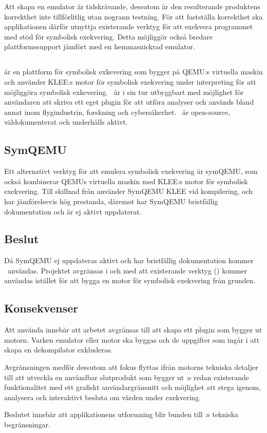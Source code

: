 
Att skapa en emulator är tidskrävande, dessutom är den resulterande produktens
korrekthet inte tillförlitlig utan nogrann testning. För att fastställa
korrekthet ska applikationen därför utnyttja existerande verktyg för att
exekvera programmet med stöd för symbolisk exekvering. Detta möjliggör också
bredare plattformssupport jämfört med en hemmasnickrad emulator.

\subsection{\stoe}
\stoe är en plattform för symbolisk exkevering som bygger på QEMU:s virtuella
maskin och använder KLEE:s motor för symbolisk exekvering under interpreting
för att möjliggöra symbolisk exkevering. \stoe\ är i sin tur utbyggbart med möjlighet
för användaren att skriva ett eget plugin för att utföra analyser och används
bland annat inom flygindustrin, forskning och cybersäkerhet. \stoe\ är open-source,
väldokumenterat och underhålls aktivt.\cite{}

\subsection{SymQEMU}

Ett alternativt verktyg för att emulera symbolisk exekvering är symQEMU, som också
kombinerar QEMUs virtuella maskin med KLEE:s motor för symbolisk exekvering. Till
skillnad från \stoe använder SymQEMU KLEE vid kompilering, och har jämförelsevis hög
prestanda, däremot har SymQEMU bristfällig dokumentation och är ej aktivt uppdaterat.
\cite{}

\subsection{Beslut}

Då SymQEMU ej uppdateras aktivt och har bristfällig dokumentation kommer \stoe\ användas.
Projektet avgränsas i och med att existerande verktyg (\stoe) kommer användas
istället för att bygga en motor för symbolisk exekvering från grunden.

\subsection{Konsekvenser}

Att använda \stoe innebär att arbetet avgränsas till att skapa ett plugin som bygger
ut motorn. Varken emulator eller motor ska byggas och de uppgifter som ingår i
att skapa en dekompilator exkluderas.

Avgränsningen medför dessutom att fokus flyttas ifrån motorns tekniska detaljer
till att utveckla en användbar slutprodukt som bygger ut \stoe:s redan
existerande funktionalitet med ett grafiskt användargränsnitt och möjlighet att
stega igenom, analysera och interaktivt besluta om värden under exekvering.

Beslutet innebär att applikationens utformning blir bunden till \stoe:s
tekniska begränsningar.
